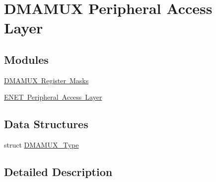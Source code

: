 \hypertarget{group___d_m_a_m_u_x___peripheral___access___layer}{}\section{D\+M\+A\+M\+UX Peripheral Access Layer}
\label{group___d_m_a_m_u_x___peripheral___access___layer}
\subsection*{Modules}
\begin{DoxyCompactItemize}
\item 
\mbox{\hyperlink{group___d_m_a_m_u_x___register___masks}{D\+M\+A\+M\+U\+X Register Masks}}
\item 
\mbox{\hyperlink{group___e_n_e_t___peripheral___access___layer}{E\+N\+E\+T Peripheral Access Layer}}
\end{DoxyCompactItemize}
\subsection*{Data Structures}
\begin{DoxyCompactItemize}
\item 
struct \mbox{\hyperlink{struct_d_m_a_m_u_x___type}{D\+M\+A\+M\+U\+X\+\_\+\+Type}}
\end{DoxyCompactItemize}


\subsection{Detailed Description}
